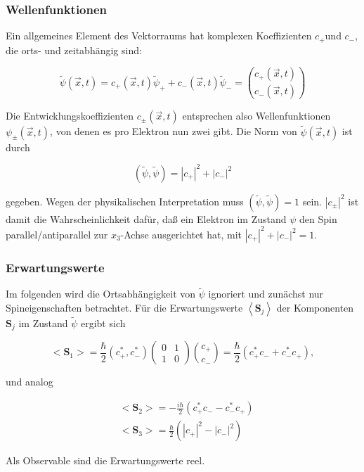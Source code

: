 \documentclass[10pt, letterpaper]{article}
\begin{document}
\subsubsection*{Wellenfunktionen}
Ein allgemeines Element des Vektorraums hat komplexen Koeffizienten $c_{+}$und $c_{-}$, die orts- und zeitabhängig sind:

$$
\tilde{\psi}(\vec{x}, t)=c_{+}(\vec{x}, t) \tilde{\psi}_{+}+c_{-}(\vec{x}, t) \tilde{\psi}_{-}=\binom{c_{+}(\vec{x}, t)}{c_{-}(\vec{x}, t)}
$$

Die Entwicklungskoeffizienten $c_{ \pm}(\vec{x}, t)$ entsprechen also Wellenfunktionen $\psi_{ \pm}(\vec{x}, t)$, von denen es pro Elektron nun zwei gibt. Die Norm von $\tilde{\psi}(\vec{x}, t)$ ist durch

$$
(\tilde{\psi}, \tilde{\psi})=\left|c_{+}\right|^{2}+\left|c_{-}\right|^{2}
$$

gegeben. Wegen der physikalischen Interpretation muss $(\tilde{\psi}, \tilde{\psi})=1$ sein. $\left|c_{ \pm}\right|^{2}$ ist damit die Wahrscheinlichkeit dafür, daß ein Elektron im Zustand $\psi$ den Spin parallel/antiparallel zur $x_{3}$-Achse ausgerichtet hat, mit $\left|c_{+}\right|^{2}+\left|c_{-}\right|^{2}=1$.

\subsubsection*{Erwartungswerte}
Im folgenden wird die Ortsabhängigkeit von $\tilde{\psi}$ ignoriert und zunächst nur Spineigenschaften betrachtet. Für die Erwartungswerte $\left\langle\mathbf{S}_{j}\right\rangle$ der Komponenten $\mathbf{S}_{j}$ im Zustand $\tilde{\psi}$ ergibt sich

$$
<\mathbf{S}_{1}>=\frac{\hbar}{2}\left(c_{+}^{*}, c_{-}^{*}\right)\left(\begin{array}{ll}
0 & 1 \\
1 & 0
\end{array}\right)\binom{c_{+}}{c_{-}}=\frac{\hbar}{2}\left(c_{+}^{*} c_{-}+c_{-}^{*} c_{+}\right),
$$

und analog

$$
\begin{aligned}
& <\mathbf{S}_{2}>=-\frac{i \hbar}{2}\left(c_{+}^{*} c_{-}-c_{-}^{*} c_{+}\right) \\
& <\mathbf{S}_{3}>=\frac{\hbar}{2}\left(\left|c_{+}\right|^{2}-\left|c_{-}\right|^{2}\right)
\end{aligned}
$$

Als Observable sind die Erwartungswerte reel.
\end{document}
